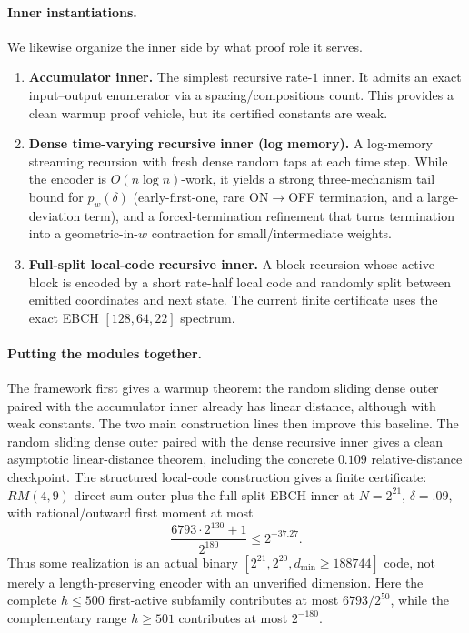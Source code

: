 \paragraph{Inner instantiations.}
We likewise organize the inner side by what proof role it serves.
\begin{enumerate}
\item \textbf{Accumulator inner.}
The simplest recursive rate-$1$ inner.  It admits an exact input--output enumerator via a spacing/compositions count.
This provides a clean warmup proof vehicle, but its certified constants are weak.
\item \textbf{Dense time-varying recursive inner (log memory).}
A log-memory streaming recursion with fresh dense random taps at each time step.
While the encoder is \(O(n\log n)\)-work, it yields a strong three-mechanism tail bound for \(p_w(\delta)\)
(early-first-one, rare ON\(\to\)OFF termination, and a large-deviation term),
and a forced-termination refinement that turns termination into a geometric-in-\(w\) contraction for small/intermediate weights.
\item \textbf{Full-split local-code recursive inner.}
A block recursion whose active block is encoded by a short rate-half local code and randomly split between emitted
coordinates and next state.  The current finite certificate uses the exact EBCH \([128,64,22]\) spectrum.
\end{enumerate}

\paragraph{Putting the modules together.}
The framework first gives a warmup theorem: the random sliding dense outer paired with the accumulator inner already has
linear distance, although with weak constants.  The two main construction lines then improve this baseline.  The random
sliding dense outer paired with the dense recursive inner gives a clean asymptotic linear-distance theorem, including the
concrete \(0.109\) relative-distance checkpoint.  The structured local-code construction gives a finite certificate:
\(RM(4,9)\) direct-sum outer plus the full-split EBCH inner at \(N=2^{21}\), \(\delta=.09\), with rational/outward first moment
at most
\[
\frac{6793\cdot2^{130}+1}{2^{180}}\le 2^{-37.27}.
\]
Thus some realization is an actual binary
\([2^{21},2^{20},d_{\min}\ge188744]\) code, not merely a
length-preserving encoder with an unverified dimension.
Here the complete \(h\le500\) first-active subfamily contributes at most
\(6793/2^{50}\), while the complementary range \(h\ge501\) contributes at most
\(2^{-180}\).

